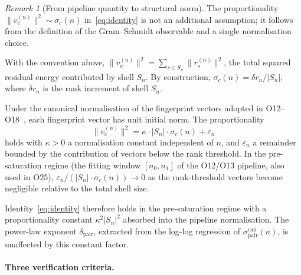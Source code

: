 \documentclass[12pt,a4paper]{article}
\theoremstyle{definition}
\theoremstyle{remark}
\newtheorem{remark}[theorem]{Remark}
\begin{document}
      \begin{remark}[From pipeline quantity to structural norm]
  The proportionality $\|v_c^{(n)}\|^2 \sim \sigma_c(n)$ in~\eqref{eq:identity}
  is not an additional assumption; it follows from the definition of the
  Gram--Schmidt observable and a single normalisation choice.

  With the convention above, $\|v_c^{(n)}\|^2 = \sum_{s \in S_n} \|r_s^{(n)}\|^2$,
  the total squared residual energy contributed by shell $S_n$.
  By construction, $\sigma_c(n) = \delta r_n / |S_n|$, where $\delta r_n$ is the
  rank increment of shell $S_n$.

  Under the canonical normalisation of the fingerprint vectors adopted in
  O12--O18~\cite{Beau2026a16,Beau2026a21,Beau2026a22}, each fingerprint
  vector has unit initial norm.
  The proportionality
  \begin{equation}
    \|v_c^{(n)}\|^2 = \kappa \cdot |S_n| \cdot \sigma_c(n) + \varepsilon_n
    \label{eq:norm-sigma-relation}
  \end{equation}
  holds with $\kappa > 0$ a normalisation constant independent of $n$, and
  $\varepsilon_n$ a remainder bounded by the contribution of vectors below the
  rank threshold.
  In the pre-saturation regime (the fitting window $[n_0, n_1]$ of the O12/O13 pipeline,
  also used in O25), $\varepsilon_n / (|S_n| \cdot \sigma_c(n)) \to 0$ as the
  rank-threshold vectors become negligible relative to the total shell size.

  Identity~\eqref{eq:identity} therefore holds in the pre-saturation regime with
  a proportionality constant $\kappa^2 |S_n|^2$ absorbed into the pipeline
  normalisation.
  The power-law exponent $\delta_{\mathrm{pair}}$, extracted from the log-log
  regression of $\sigma^{\mathrm{can}}_{\mathrm{pair}}(n)$, is unaffected by
  this constant factor.
      \end{remark}

    \paragraph{Three verification criteria.}
\end{document}
